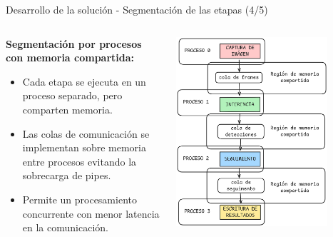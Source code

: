 \documentclass[spanish]{beamer}
\begin{document}
\begin{frame}{Desarrollo de la solución - Segmentación de las etapas (4/5)}
    \begin{columns}
        \begin{column}{0.5\textwidth}
            \textbf{Segmentación por procesos con memoria compartida:}
            \begin{itemize}
                \item Cada etapa se ejecuta en un proceso separado, pero comparten memoria.
                \item Las colas de comunicación se implementan sobre memoria entre procesos evitando la sobrecarga de pipes.
                \item Permite un procesamiento concurrente con menor latencia en la comunicación.
            \end{itemize}
        \end{column}
        \begin{column}{0.5\textwidth}
                \begin{center}
                \includegraphics[width=0.8\textwidth]{images/solucion_propuesta/segmentacion_procesos_memoria_compartida.png}
            \end{center}
        \end{column}
    \end{columns}
\end{frame}
\end{document}

